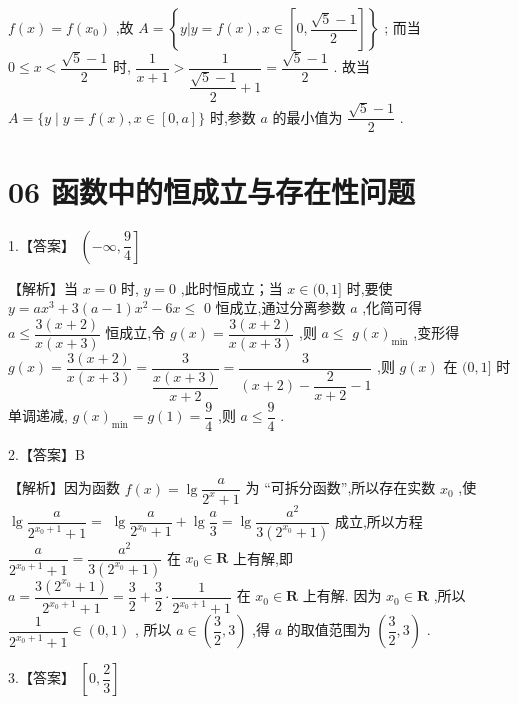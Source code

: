\documentclass[10pt]{article}
\begin{document}
$f\left( x\right)  = f\left( {x}_{0}\right)$ ,故 $A = \left\{  {y\left| {y = f\left( x\right) }\right. ,x \in  \left\lbrack  {0,\dfrac{\sqrt{5} - 1}{2}}\right\rbrack  }\right\}$ ; 而当 $0 \leq  x < \dfrac{\sqrt{5} - 1}{2}$ 时, $\dfrac{1}{x + 1} > \dfrac{1}{\dfrac{\sqrt{5} - 1}{2} + 1} = \dfrac{\sqrt{5} - 1}{2}$ . 故当 $A = \{ y \mid  y = f\left( x\right) ,x \in  \left\lbrack  {0,a}\right\rbrack  \}$ 时,参数 $a$ 的最小值为 $\dfrac{\sqrt{5} - 1}{2}$ .

\section*{06 函数中的恒成立与存在性问题}

1.【答案】 $\left( {-\infty ,\dfrac{9}{4}}\right\rbrack$

【解析】当 $x = 0$ 时, $y = 0$ ,此时恒成立；当 $x \in  (0,1\rbrack$ 时,要使 $y = a{x}^{3} + 3\left( {a - 1}\right) {x}^{2} - {6x} \leq$ 0 恒成立,通过分离参数 $a$ ,化简可得 $a \leq  \dfrac{3\left( {x + 2}\right) }{x\left( {x + 3}\right) }$ 恒成立,令 $g\left( x\right)  = \dfrac{3\left( {x + 2}\right) }{x\left( {x + 3}\right) }$ ,则 $a \leq$  $g{\left( x\right) }_{\min }$ ,变形得 $g\left( x\right)  = \dfrac{3\left( {x + 2}\right) }{x\left( {x + 3}\right) } = \dfrac{3}{\dfrac{x\left( {x + 3}\right) }{x + 2}} = \dfrac{3}{\left( {x + 2}\right)  - \dfrac{2}{x + 2} - 1}$ ,则 $g\left( x\right)$ 在 $(0,1\rbrack$ 时单调递减, $g{\left( x\right) }_{\min } = g\left( 1\right)  = \dfrac{9}{4}$ ,则 $a \leq  \dfrac{9}{4}$ .

2.【答案】B

【解析】因为函数 $f\left( x\right)  = \lg \dfrac{a}{{2}^{x} + 1}$ 为 “可拆分函数”,所以存在实数 ${x}_{0}$ ,使 $\lg \dfrac{a}{{2}^{{x}_{0} + 1} + 1} =$  $\lg \dfrac{a}{{2}^{{x}_{0}} + 1} + \lg \dfrac{a}{3} = \lg \dfrac{{a}^{2}}{3\left( {{2}^{{x}_{0}} + 1}\right) }$ 成立,所以方程 $\dfrac{a}{{2}^{{x}_{0} + 1} + 1} = \dfrac{{a}^{2}}{3\left( {{2}^{{x}_{0}} + 1}\right) }$ 在 ${x}_{0} \in  \mathbf{R}$ 上有解,即 $a = \dfrac{3\left( {{2}^{{x}_{0}} + 1}\right) }{{2}^{{x}_{0} + 1} + 1} = \dfrac{3}{2} + \dfrac{3}{2} \cdot  \dfrac{1}{{2}^{{x}_{0} + 1} + 1}$ 在 ${x}_{0} \in  \mathbf{R}$ 上有解. 因为 ${x}_{0} \in  \mathbf{R}$ ,所以 $\dfrac{1}{{2}^{{x}_{0} + 1} + 1} \in  \left( {0,1}\right)$ , 所以 $a \in  \left( {\dfrac{3}{2},3}\right)$ ,得 $a$ 的取值范围为 $\left( {\dfrac{3}{2},3}\right)$ .

3.【答案】 $\left\lbrack  {0,\dfrac{2}{3}}\right\rbrack$
\end{document}
